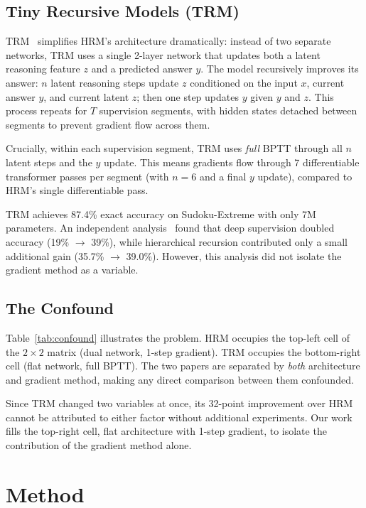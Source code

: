 \documentclass{article}
\begin{document}
\subsection{Tiny Recursive Models (TRM)}

TRM~\cite{jolicoeur2025trm} simplifies HRM's architecture dramatically: instead of two separate networks, TRM uses a single 2-layer network that updates both a latent reasoning feature $z$ and a predicted answer $y$. The model recursively improves its answer: $n$ latent reasoning steps update $z$ conditioned on the input $x$, current answer $y$, and current latent $z$; then one step updates $y$ given $y$ and $z$. This process repeats for $T$ supervision segments, with hidden states detached between segments to prevent gradient flow across them.

Crucially, within each supervision segment, TRM uses \emph{full} BPTT through all $n$ latent steps and the $y$ update. This means gradients flow through 7 differentiable transformer passes per segment (with $n=6$ and a final $y$ update), compared to HRM's single differentiable pass.

TRM achieves 87.4\% exact accuracy on Sudoku-Extreme with only 7M parameters. An independent analysis~\cite{arcprize2025} found that deep supervision doubled accuracy (19\% $\rightarrow$ 39\%), while hierarchical recursion contributed only a small additional gain (35.7\% $\rightarrow$ 39.0\%). However, this analysis did not isolate the gradient method as a variable.

\subsection{The Confound}

Table~\ref{tab:confound} illustrates the problem. HRM occupies the top-left cell of the $2\times2$ matrix (dual network, 1-step gradient). TRM occupies the bottom-right cell (flat network, full BPTT). The two papers are separated by \emph{both} architecture and gradient method, making any direct comparison between them confounded.

Since TRM changed two variables at once, its 32-point improvement over HRM cannot be attributed to either factor without additional experiments. Our work fills the top-right cell, flat architecture with 1-step gradient, to isolate the contribution of the gradient method alone.

\section{Method}
\end{document}
